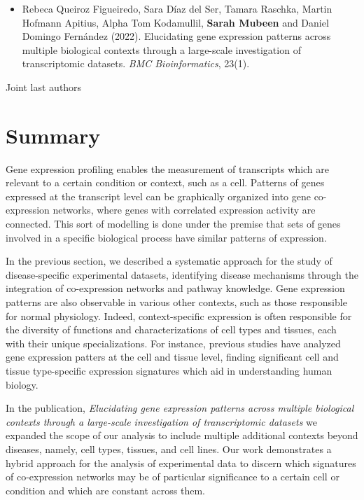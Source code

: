 \begin{itemize}

\item[] Rebeca Queiroz Figueiredo, Sara Díaz del Ser, Tamara Raschka, Martin Hofmann Apitius, Alpha Tom Kodamullil, \textbf{Sarah Mubeen}\textsuperscript{\textdagger} and Daniel Domingo Fernández\textsuperscript{\textdagger} (2022). Elucidating gene expression patterns across multiple biological contexts through a large-scale investigation of transcriptomic datasets. \textit{BMC Bioinformatics}, 23(1).

\end{itemize}

\textsuperscript{\textdagger} Joint last authors

\section*{Summary}

Gene expression profiling enables the measurement of transcripts which are relevant to a certain condition or context, such as a cell. Patterns of genes expressed at the transcript level can be graphically organized into gene co-expression networks, where genes with correlated expression activity are connected. This sort of modelling is done under the premise that sets of genes involved in a specific biological process have similar patterns of expression.

In the previous section, we described a systematic approach for the study of disease-specific experimental datasets, identifying disease mechanisms through the integration of co-expression networks and pathway knowledge. Gene expression patterns are also observable in various other contexts, such as those responsible for normal physiology. Indeed, context-specific expression is often responsible for the diversity of functions and characterizations of cell types and tissues, each with their unique specializations. For instance, previous studies \parencite{dobrin2009, pierson2015, mckenzie2018} have analyzed gene expression patters at the cell and tissue level, finding significant cell and tissue type-specific expression signatures which aid in understanding human biology. 

In the publication, \textit{Elucidating gene expression patterns across multiple biological contexts through a large-scale investigation of transcriptomic datasets} we expanded the scope of our analysis to include multiple additional contexts beyond diseases, namely, cell types, tissues, and cell lines. Our work demonstrates a hybrid approach for the analysis of experimental data to discern which signatures of co-expression networks may be of particular significance to a certain cell or condition and which are constant across them.

